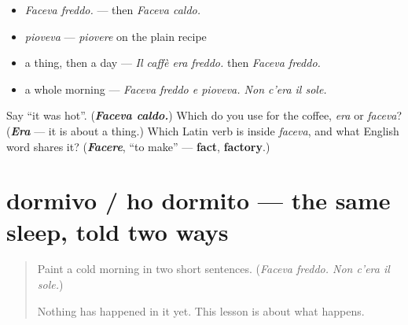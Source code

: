 \begin{itemize}
\raggedright
  \item \emph{Faceva freddo.} — then \emph{Faceva caldo.}
  \item \emph{pioveva} — \emph{piovere} on the plain recipe
  \item a thing, then a day — \emph{Il caffè era freddo.} then \emph{Faceva freddo.}
  \item a whole morning — \emph{Faceva freddo e pioveva. Non c'era il sole.}
\end{itemize}

\begin{tcolorbox}[breakable,colback=teal!4,colframe=teal!35!black,title={Before you move on}]
Say \textquotedblleft{}it was hot\textquotedblright{}. (\emph{\textbf{Faceva caldo.}}) Which do you use for the coffee, \emph{era} or \emph{faceva}? (\emph{\textbf{Era}} — it is about a thing.) Which Latin verb is inside \emph{faceva}, and what English word shares it? (\emph{\textbf{Facere}}, \textquotedblleft{}to make\textquotedblright{} — \textbf{fact}, \textbf{factory}.)
\end{tcolorbox}
\section[dormivo / ho dormito]{dormivo / ho dormito — the same sleep, told two ways}

\label{lesson:IT-C263-dormivo}



\begin{quote}
Paint a cold morning in two short sentences. (\emph{Faceva freddo. Non c'era il sole.})

Nothing has happened in it yet. This lesson is about what happens.
\end{quote}

